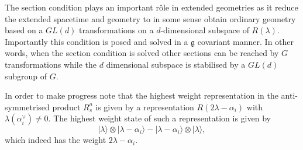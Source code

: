 The section condition plays an important rôle in extended geometries as it reduce the extended spacetime and geometry to in some sense obtain ordinary geometry based on a $GL(d)$ transformations on a $d$-dimensional subspace of $R(\lambda)$. Importantly this condition is posed and solved in a $\mathfrak{g}$ covariant manner. In other words, when the section condition is solved other sections can be reached by $G$ transformations while the $d$ dimensional subspace is stabilised by a $GL(d)$ subgroup of $G$. 

In order to make progress note that the highest weight representation in the anti-symmetrised product $R_s^a$ is given by a representation $R(2\lambda-\alpha_i)$ with $\lambda(\alpha^\vee_i)\neq 0$. The highest weight state of such a representation is given by
\begin{equation}
    |\lambda\rangle \otimes |\lambda-\alpha_i\rangle - |\lambda-\alpha_i\rangle \otimes |\lambda\rangle,
\end{equation}
which indeed has the weight $2\lambda-\alpha_i$. 

